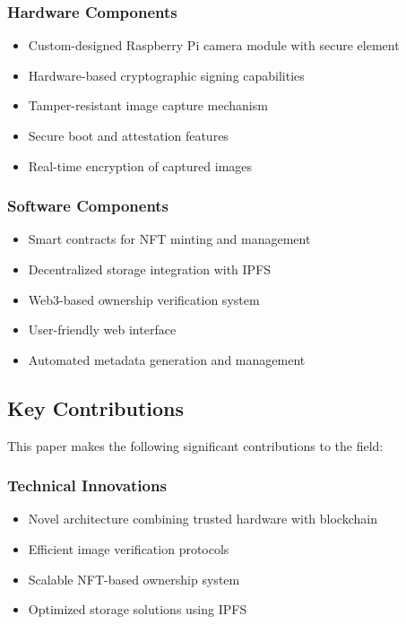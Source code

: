 \documentclass[conference]{IEEEtran}
\begin{document}
\subsubsection{Hardware Components}
\begin{itemize}
    \item Custom-designed Raspberry Pi camera module with secure element
    \item Hardware-based cryptographic signing capabilities
    \item Tamper-resistant image capture mechanism
    \item Secure boot and attestation features
    \item Real-time encryption of captured images
\end{itemize}

\subsubsection{Software Components}
\begin{itemize}
    \item Smart contracts for NFT minting and management
    \item Decentralized storage integration with IPFS
    \item Web3-based ownership verification system
    \item User-friendly web interface
    \item Automated metadata generation and management
\end{itemize}

\subsection{Key Contributions}
This paper makes the following significant contributions to the field:

\subsubsection{Technical Innovations}
\begin{itemize}
    \item Novel architecture combining trusted hardware with blockchain
    \item Efficient image verification protocols
    \item Scalable NFT-based ownership system
    \item Optimized storage solutions using IPFS
\end{itemize}
\end{document}
